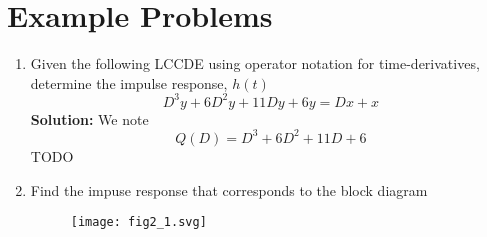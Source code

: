 \documentclass{article}
\begin{document}
\section{Example Problems}

\begin{enumerate}
\item Given the following LCCDE using operator notation for time-derivatives, determine the impulse response, $h(t)$
  \begin{equation}
    D^3y + 6D^2y + 11Dy + 6y = Dx + x
  \end{equation}
  \textbf{Solution:} We note
  \[
  Q(D) = D^3 + 6D^2 + 11D + 6
  \]
  TODO

\item Find the impuse response that corresponds to the block diagram

  \begin{figure}
    \centering
    \texttt{[image: fig2\_1.svg]}
%    
  \end{figure}
  
\end{enumerate}
\end{document}
